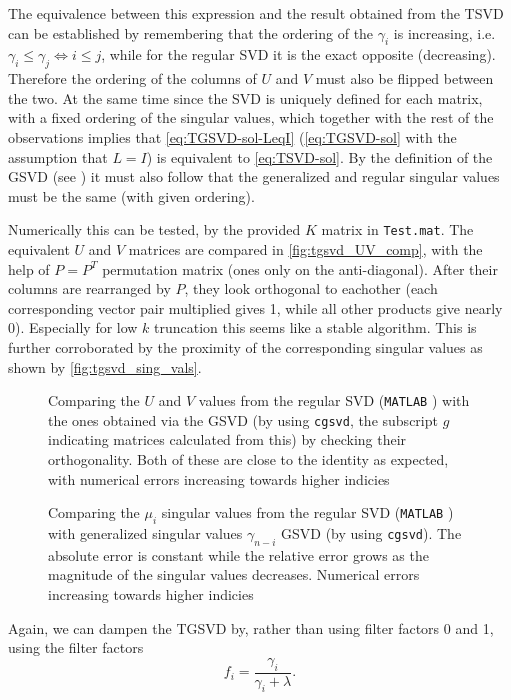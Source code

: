 \documentclass{article}
\begin{document}
	The equivalence between this expression and the result obtained from the TSVD can be established by remembering that the ordering of the $\gamma_i$ is increasing, i.e. $\gamma_i \leq \gamma_j \Leftrightarrow i \leq j$, while for the regular SVD it is the exact opposite (decreasing). Therefore the ordering of the columns of $U$ and $V$ must also be flipped between the two. At the same time since the SVD is uniquely defined for each matrix, with a fixed ordering of the singular values, which together with the rest of the observations implies that \autoref{eq:TGSVD-sol-LeqI} (\autoref{eq:TGSVD-sol} with the assumption that $L=I$) is equivalent to \autoref{eq:TSVD-sol}. By the definition of the GSVD (see \autocite{gsvd_paige_saunders}) it must also follow that the generalized and regular singular values must be the same (with given ordering).
	
	Numerically this can be tested, by the provided $K$ matrix in \texttt{Test.mat}. The equivalent $U$ and $V$ matrices are compared in \autoref{fig:tgsvd_UV_comp}, with the help of $P=P^T$ permutation matrix (ones only on the anti-diagonal). After their columns are rearranged by $P$, they look orthogonal to eachother (each corresponding vector pair multiplied gives 1, while all other products give nearly 0). Especially for low $k$ truncation this seems like a stable algorithm. This is further corroborated by the proximity of the corresponding singular values as shown by \autoref{fig:tgsvd_sing_vals}.
	
	\begin{figure}[h!]
		\centering
		\resizebox{\textwidth}{!}{}
		\caption{Comparing the $U$ and $V$ values from the regular SVD (\texttt{MATLAB} ) with the ones obtained via the GSVD (by using \texttt{cgsvd}, the subscript $g$ indicating matrices calculated from this) by checking their orthogonality. Both of these are close to the identity as expected, with numerical errors increasing towards higher indicies}\label{fig:tgsvd_UV_comp}
	\end{figure}
	\begin{figure}[h!]
		\centering
		\resizebox{0.7\textwidth}{!}{}
		\caption{Comparing the $\mu_i$ singular values from the regular SVD (\texttt{MATLAB} ) with generalized singular values $\gamma_{n-i}$ GSVD (by using \texttt{cgsvd}). The absolute error is constant while the relative error grows as the magnitude of the singular values decreases.  Numerical errors increasing towards higher indicies}\label{fig:tgsvd_sing_vals}
	\end{figure}
	Again, we can dampen the TGSVD by, rather than using filter factors 0 and 1, using the filter
	factors
	$$f_i=\frac{\gamma_i}{\gamma_i+\lambda}.$$
	\FloatBarrier
	
\end{document}
